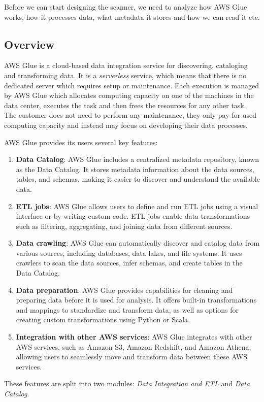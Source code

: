 Before we can start designing the scanner, we need to analyze how AWS Glue works, how it processes data, what metadata it stores and how we can read it etc. 

\subsection{Overview}

AWS Glue is a cloud-based data integration service for discovering, cataloging and transforming data. It is a \textit{serverless} service, which means that there is no dedicated server which requires setup or maintenance. Each execution is managed by AWS Glue which allocates computing capacity on one of the machines in the data center, executes the task and then frees the resources for any other task. The customer does not need to perform any maintenance, they only pay for used computing capacity and instead may focus on developing their data processes.
\par
AWS Glue provides its users several key features:
\begin{enumerate}
    \item \textbf{Data Catalog}: AWS Glue includes a centralized metadata repository, known as the Data Catalog. It stores metadata information about the data sources, tables, and schemas, making it easier to discover and understand the available data.
    \item \textbf{ETL jobs}: AWS Glue allows users to define and run ETL jobs using a visual interface or by writing custom code. ETL jobs enable data transformations such as filtering, aggregating, and joining data from different sources.
    \item \textbf{Data crawling}: AWS Glue can automatically discover and catalog data from various sources, including databases, data lakes, and file systems. It uses crawlers to scan the data sources, infer schemas, and create tables in the Data Catalog.
    \item \textbf{Data preparation}: AWS Glue provides capabilities for cleaning and preparing data before it is used for analysis. It offers built-in transformations and mappings to standardize and transform data, as well as options for creating custom transformations using Python or Scala.
    \item \textbf{Integration with other AWS services}: AWS Glue integrates with other AWS services, such as Amazon S3, Amazon Redshift, and Amazon Athena, allowing users to seamlessly move and transform data between these AWS services.
\end{enumerate}
\par
These features are split into two modules: \textit{Data Integration and ETL} and \textit{Data Catalog}.

